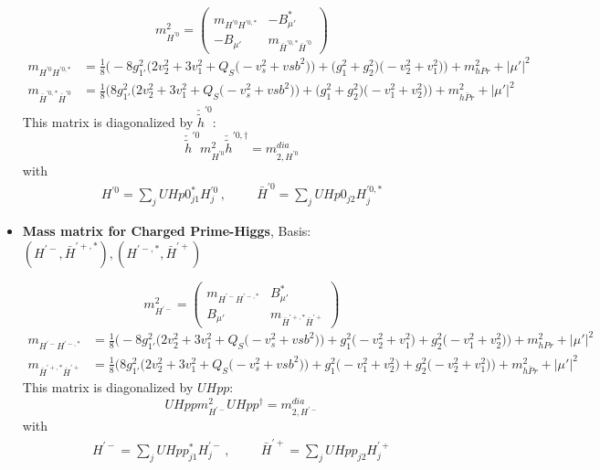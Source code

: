 \begin{itemize}
\begin{equation} 
m^2_{H^{'0}} = \left( 
\begin{array}{cc}
m_{H^{'0}H^{{'0},*}} &- B_{\mu'}^* \\ 
- B_{\mu'}  &m_{\bar{H}^{{'0},*}\bar{H}^{'0}}\end{array} 
\right) 
 \end{equation} 
\begin{align} 
m_{H^{'0}H^{{'0},*}} &= \frac{1}{8} \Big(-8 g_{1'}^{2} \Big(2 v_{2}^{2}  + 3 v_{1}^{2}  + Q_{S} \Big(- v_{s}^{2}  + vsb^{2}\Big)\Big) + \Big(g_{1}^{2} + g_{2}^{2}\Big)\Big(- v_{2}^{2}  + v_{1}^{2}\Big)\Big) + m_{hPr}^2 + |\mu'|^2\\ 
m_{\bar{H}^{{'0},*}\bar{H}^{'0}} &= \frac{1}{8} \Big(8 g_{1'}^{2} \Big(2 v_{2}^{2}  + 3 v_{1}^{2}  + Q_{S} \Big(- v_{s}^{2}  + vsb^{2}\Big)\Big) + \Big(g_{1}^{2} + g_{2}^{2}\Big)\Big(- v_{1}^{2}  + v_{2}^{2}\Big)\Big) + m_{\bar{hPr}}^2 + |\mu'|^2
\end{align} 
This matrix is diagonalized by \(\check{\tilde{h}}^{'0}\): 
\begin{equation} 
\check{\tilde{h}}^{'0} m^2_{H^{'0}} \check{\tilde{h}}^{'0,\dagger} = m^{dia}_{2,H^{'0}} 
\end{equation} 
with 
\begin{align} 
H^{'0} = \sum_{j}UHp0^*_{j 1}H^{'0}_{{j}}\,, \hspace{1cm} 
\bar{H}^{'0} = \sum_{j}UHp0_{{j 2}}H^{{'0},*}_{{j}}
\end{align} 
\item {\bf Mass matrix for Charged Prime-Higgs}, Basis: \( \left(H^{'-}, \bar{H}^{{'+},*}\right), \left(H^{{'-},*}, \bar{H}^{'+}\right) \) 
 
\begin{equation} 
m^2_{H^{'-}} = \left( 
\begin{array}{cc}
m_{H^{'-}H^{{'-},*}} &B_{\mu'}^*\\ 
B_{\mu'} &m_{\bar{H}^{{'+},*}\bar{H}^{'+}}\end{array} 
\right) 
 \end{equation} 
\begin{align} 
m_{H^{'-}H^{{'-},*}} &= \frac{1}{8} \Big(-8 g_{1'}^{2} \Big(2 v_{2}^{2}  + 3 v_{1}^{2}  + Q_{S} \Big(- v_{s}^{2}  + vsb^{2}\Big)\Big) + g_{1}^{2} \Big(- v_{2}^{2}  + v_{1}^{2}\Big) + g_{2}^{2} \Big(- v_{1}^{2}  + v_{2}^{2}\Big)\Big) + m_{hPr}^2 + |\mu'|^2\\ 
m_{\bar{H}^{{'+},*}\bar{H}^{'+}} &= \frac{1}{8} \Big(8 g_{1'}^{2} \Big(2 v_{2}^{2}  + 3 v_{1}^{2}  + Q_{S} \Big(- v_{s}^{2}  + vsb^{2}\Big)\Big) + g_{1}^{2} \Big(- v_{1}^{2}  + v_{2}^{2}\Big) + g_{2}^{2} \Big(- v_{2}^{2}  + v_{1}^{2}\Big)\Big) + m_{\bar{hPr}}^2 + |\mu'|^2
\end{align} 
This matrix is diagonalized by \(UHpp\): 
\begin{equation} 
UHpp m^2_{H^{'-}} UHpp^{\dagger} = m^{dia}_{2,H^{'-}} 
\end{equation} 
with 
\begin{align} 
H^{'-} = \sum_{j}UHpp^*_{j 1}H^{'-}_{{j}}\,, \hspace{1cm} 
\bar{H}^{'+} = \sum_{j}UHpp_{{j 2}}H^{'+}_{{j}}
\end{align} 
\end{itemize} 

